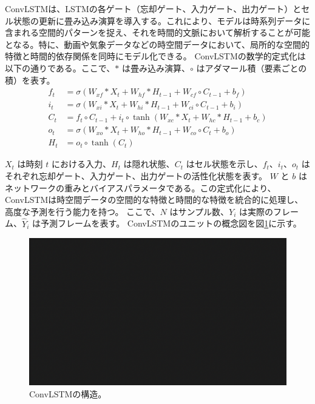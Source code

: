       ConvLSTMは、LSTMの各ゲート（忘却ゲート、入力ゲート、出力ゲート）とセル状態の更新に畳み込み演算を導入する。これにより、モデルは時系列データに含まれる空間的パターンを捉え、それを時間的文脈において解析することが可能となる。特に、動画や気象データなどの時空間データにおいて、局所的な空間的特徴と時間的依存関係を同時にモデル化できる。
      ConvLSTMの数学的定式化は以下の通りである。ここで、\( \ast \) は畳み込み演算、\( \circ \) はアダマール積（要素ごとの積）を表す。
      \begin{align}
        f_t &= \sigma(W_{xf} \ast X_t + W_{hf} \ast H_{t-1} + W_{cf} \circ C_{t-1} + b_f) \\
        i_t &= \sigma(W_{xi} \ast X_t + W_{hi} \ast H_{t-1} + W_{ci} \circ C_{t-1} + b_i) \\
        C_t &= f_t \circ C_{t-1} + i_t \circ \tanh(W_{xc} \ast X_t + W_{hc} \ast H_{t-1} + b_c) \\
        o_t &= \sigma(W_{xo} \ast X_t + W_{ho} \ast H_{t-1} + W_{co} \circ C_t + b_o) \\
        H_t &= o_t \circ \tanh(C_t)
      \end{align}

      \( X_t \) は時刻 \( t \) における入力、\( H_t \) は隠れ状態、\( C_t \) はセル状態を示し、\( f_t \)、\( i_t \)、\( o_t \) はそれぞれ忘却ゲート、入力ゲート、出力ゲートの活性化状態を表す。
      \( W \) と \( b \) はネットワークの重みとバイアスパラメータである。この定式化により、ConvLSTMは時空間データの空間的な特徴と時間的な特徴を統合的に処理し、高度な予測を行う能力を持つ。
      ここで、\( N \) はサンプル数、\( Y_i \) は実際のフレーム、\( \hat{Y}_i \) は予測フレームを表す。
      ConvLSTMのユニットの概念図を図\ref{fig:convlstm}に示す。
      \begin{figure}[htbp]
        \centering
        \includegraphics[width=\textwidth]{figures/sample.png}
        \caption{ConvLSTMの構造。}
        \label{fig:convlstm}
      \end{figure}

